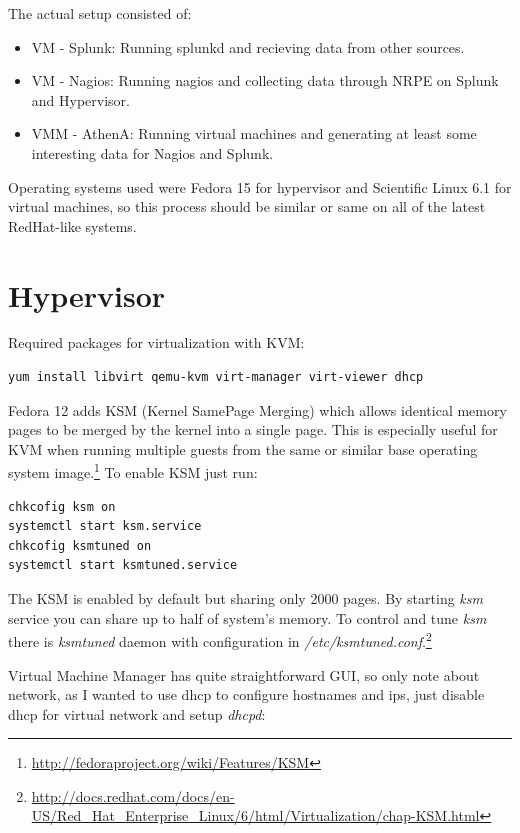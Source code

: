 \documentclass[10pt,a4paper,final]{report}
\begin{document}
The actual setup consisted of:
\begin{itemize}
\item VM - Splunk: Running splunkd and recieving data from other sources.
\item VM - Nagios: Running nagios and collecting data through NRPE on Splunk and Hypervisor.
\item VMM - AthenA: Running virtual machines and generating at least some interesting data for Nagios and Splunk.
\end{itemize}
Operating systems used were Fedora 15 for hypervisor and Scientific Linux 6.1 for virtual machines, so this process should be similar or same on all of the latest RedHat-like systems.

\section{Hypervisor}
Required packages for virtualization with KVM:
\begin{lstlisting}
yum install libvirt qemu-kvm virt-manager virt-viewer dhcp
\end{lstlisting} 
Fedora 12 adds KSM (Kernel SamePage Merging) which allows identical memory pages to be merged by the kernel into a single page. This is especially useful for KVM when running multiple guests from the same or similar base operating system image.\footnote{\url{http://fedoraproject.org/wiki/Features/KSM}} To enable KSM just run:

\begin{lstlisting}
chkcofig ksm on
systemctl start ksm.service
chkcofig ksmtuned on
systemctl start ksmtuned.service
\end{lstlisting}
The KSM is enabled by default but sharing only 2000 pages. By starting \emph{ksm} service you can share up to half of system's memory. To control and tune \emph{ksm} there is \emph{ksmtuned} daemon with configuration in \emph{/etc/ksmtuned.conf}.\footnote{\url{http://docs.redhat.com/docs/en-US/Red\_Hat\_Enterprise\_Linux/6/html/Virtualization/chap-KSM.html}}

Virtual Machine Manager has quite straightforward GUI, so only note about network, as I wanted to use dhcp to configure hostnames and ips, just disable dhcp for virtual network and setup \emph{dhcpd}:
\end{document}
